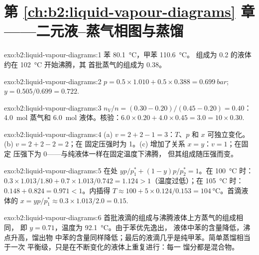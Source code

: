 \section*{第 \ref{ch:b2:liquid-vapour-diagrams} 章——二元液–蒸气相图与蒸馏}

\begin{solution}{exo:b2:liquid-vapour-diagrams:1}
苯 \qty{80.1}{\degreeCelsius}，甲苯 \qty{110.6}{\degreeCelsius}。
组成为 0.2 的液体约在 \qty{102}{\degreeCelsius} 开始沸腾，其
首批蒸气的组成为 0.38。
\end{solution}

\begin{solution}{exo:b2:liquid-vapour-diagrams:2}
$p = 0.5 \times 1.010 + 0.5 \times 0.388 = \qty{0.699}{bar}$;
$y = 0.505/0.699 = 0.722$.
\end{solution}

\begin{solution}{exo:b2:liquid-vapour-diagrams:3}
$n_V/n = (0.30 - 0.20)/(0.45 - 0.20) = 0.40$：\qty{4.0}{mol} 蒸气和
\qty{6.0}{mol} 液体。核验：$6.0 \times 0.20 + 4.0 \times 0.45 = 3.0 = 10
\times 0.30$.
\end{solution}

\begin{solution}{exo:b2:liquid-vapour-diagrams:4}
(a) $v = 2 + 2 - 1 = 3$：$T$、$p$ 和 $x$ 可独立变化。(b) $v = 2 + 2 - 2 = 2$；在
固定压强时为 1。(c) 增加了关系 $x = y$：$v = 1$；在固定
压强下为 0——与纯液体一样在固定温度下沸腾，
但其组成随压强而变。
\end{solution}

\begin{solution}{exo:b2:liquid-vapour-diagrams:5}
在处 $yp/p_1^* + (1 - y)p/p_2^* = 1$。在 \qty{100}{\degreeCelsius} 时：
$0.3 \times 1.013/1.80 + 0.7 \times 1.013/0.742 = 1.124 > 1$（温度过低）；在
\qty{105}{\degreeCelsius} 时：$0.148 + 0.824 = 0.971 < 1$。内插得 $T \approx
100 + 5 \times 0.124/0.153 = \qty{104}{\degreeCelsius}$。首滴液体的 $x =
yp/p_1^* \approx 0.3 \times 1.013/2.0 = 0.15$.
\end{solution}

\begin{solution}{exo:b2:liquid-vapour-diagrams:6}
首批液滴的组成与沸腾液体上方蒸气的组成相同，
即 $y = 0.71$，温度为 \qty{92.1}{\degreeCelsius}。由于苯优先逸出，
液体中苯的含量降低，沸点升高，馏出物
中苯的含量同样降低；最后的液滴几乎是纯甲苯。简单蒸馏相当于一次
平衡级，只是在不断变化的液体上重复进行：每一
馏分都是混合物。
\end{solution}

